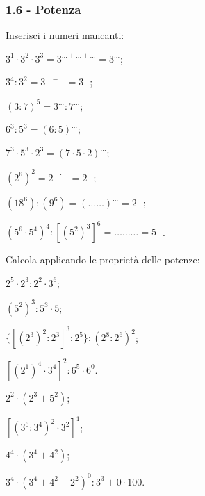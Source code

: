 \subsubsection*{1.6 - Potenza}
\begin{esercizio}
\label{ese:1.10}
Inserisci i numeri mancanti:
 \begin{multicols}{2}
 \begin{enumeratea}
 \item $3^1\cdot3^2\cdot3^3=3^{\ldots+\ldots+\ldots}=3^{\ldots}$;
 \item $3^4:3^2=3^{\ldots-\ldots}=3^{\ldots}$;
 \item $(3:7)^5=3^{\ldots}:7^{\ldots}$;
 \item $6^3:5^3=(6:5)^{\ldots}$;
 \item $7^3\cdot5^3\cdot2^3=(7\cdot 5 \cdot 2)^{\ldots}$;
 \item $(2^6)^2=2^{\ldots\cdot\ldots}=2^{\ldots}$;
 \item $(18^6):(9^6)=(\ldots\ldots)^{\ldots}=2^{\ldots}$;
 \item $(5^6\cdot5^4)^4:[(5^2)^3]^6=\ldots\ldots\ldots=5^{\ldots}$.
 \end{enumeratea}

 \end{multicols}
\end{esercizio}

\begin{esercizio}[\Ast]
\label{ese:1.11}
Calcola applicando le proprietà delle potenze:
 \begin{multicols}{2}
 \begin{enumeratea}
 \item $2^5\cdot2^3:2^2\cdot3^6$;
 \item $(5^2)^3:5^3\cdot5$;
 \item $\{[(2^3)^2:2^3]^3:2^5\}:(2^8:2^6)^2$;
 \item $[(2^1)^4\cdot 3^4]^2:6^5\cdot6^0$.
 \item $2^2\cdot(2^3+5^2)$;
 \item $[(3^6:3^4)^2\cdot3^2]^1$;
 \item $4^4\cdot(3^4+4^2)$;
 \item $3^4\cdot(3^4+4^2-2^2)^0:3^3+0\cdot 100$.
 \end{enumeratea}
 \end{multicols}
\end{esercizio}

